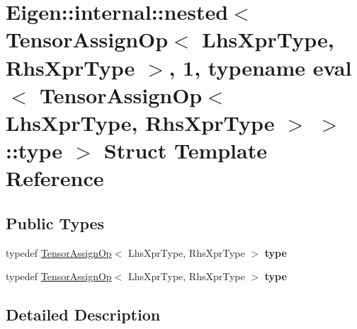 \hypertarget{struct_eigen_1_1internal_1_1nested_3_01_tensor_assign_op_3_01_lhs_xpr_type_00_01_rhs_xpr_type_01d4159a152a0e6ba4b4de0b2584842bf3}{}\section{Eigen\+:\+:internal\+:\+:nested$<$ Tensor\+Assign\+Op$<$ Lhs\+Xpr\+Type, Rhs\+Xpr\+Type $>$, 1, typename eval$<$ Tensor\+Assign\+Op$<$ Lhs\+Xpr\+Type, Rhs\+Xpr\+Type $>$ $>$\+:\+:type $>$ Struct Template Reference}
\label{struct_eigen_1_1internal_1_1nested_3_01_tensor_assign_op_3_01_lhs_xpr_type_00_01_rhs_xpr_type_01d4159a152a0e6ba4b4de0b2584842bf3}
\subsection*{Public Types}
\begin{DoxyCompactItemize}
\item 
\mbox{\label{struct_eigen_1_1internal_1_1nested_3_01_tensor_assign_op_3_01_lhs_xpr_type_00_01_rhs_xpr_type_01d4159a152a0e6ba4b4de0b2584842bf3_a425a3d77941857370cf7e6910e3f3aa8}} 
typedef \hyperlink{class_eigen_1_1_tensor_assign_op}{Tensor\+Assign\+Op}$<$ Lhs\+Xpr\+Type, Rhs\+Xpr\+Type $>$ {\bfseries type}
\item 
\mbox{\label{struct_eigen_1_1internal_1_1nested_3_01_tensor_assign_op_3_01_lhs_xpr_type_00_01_rhs_xpr_type_01d4159a152a0e6ba4b4de0b2584842bf3_a425a3d77941857370cf7e6910e3f3aa8}} 
typedef \hyperlink{class_eigen_1_1_tensor_assign_op}{Tensor\+Assign\+Op}$<$ Lhs\+Xpr\+Type, Rhs\+Xpr\+Type $>$ {\bfseries type}
\end{DoxyCompactItemize}


\subsection{Detailed Description}
